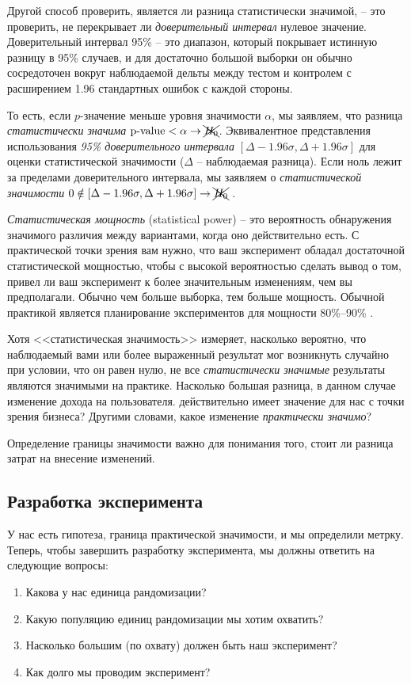 \documentclass[%
	11pt,
	a4paper,
	utf8,
		]{article}
\begin{document}
Другой способ проверить, является ли разница статистически значимой, -- это проверить, не перекрывает ли \emph{доверительный интервал} нулевое значение. Доверительный интервал 95\% -- это диапазон, который покрывает истинную разницу в 95\% случаев, и для достаточно большой выборки он обычно сосредоточен вокруг наблюдаемой дельты между тестом и контролем с расширением 1.96 стандартных ошибок с каждой стороны.

То есть, если $p$-значение меньше уровня значимости $\alpha$, мы заявляем, что разница \emph{статистически значима} {\color{blue}$ \text{p-value} < \alpha \to \xcancel{H_0} $}. Эквивалентное представления использования \emph{95\% доверительного интервала} $[\Delta - 1.96 \sigma, \Delta + 1.96 \sigma]$ для оценки статистической значимости ($\Delta$ -- наблюдаемая разница). Если ноль лежит за пределами доверительного интервала, мы заявляем о \emph{статистической значимости} {\color{blue}$0 \notin [\Delta - 1.96 \sigma, \Delta + 1.96 \sigma] \to \xcancel{H_0}$} \cite[]{kohavi:ab-tests-2021}.

\emph{Статистическая мощность} (statistical power) -- это вероятность обнаружения значимого различия между вариантами, когда оно действительно есть. С практической точки зрения вам нужно, что ваш эксперимент обладал достаточной статистической мощностью, чтобы с высокой вероятностью сделать вывод о том, привел ли ваш эксперимент к более значительным изменениям, чем вы предполагали. Обычно чем больше выборка, тем больше мощность. Обычной практикой является планирование экспериментов для мощности 80\%--90\% \cite[]{kohavi:ab-tests-2021}.

Хотя <<статистическая значимость>> измеряет, насколько вероятно, что наблюдаемый вами или более выраженный результат мог возникнуть случайно при условии, что он равен нулю, не все \emph{статистически значимые} результаты являются значимыми на практике. Насколько большая разница, в данном случае изменение дохода на пользователя. действительно имеет значение для нас с точки зрения бизнеса? Другими словами, какое изменение \emph{практически значимо}?

Определение границы значимости важно для понимания того, стоит ли разница затрат на внесение изменений.

\subsection{Разработка эксперимента}

У нас есть гипотеза, граница практической значимости, и мы определили метрку. Теперь, чтобы завершить разработку эксперимента, мы должны ответить на следующие вопросы:
\begin{enumerate}
	\item Какова у нас единица рандомизации?
	
	\item Какую популяцию единиц рандомизации мы хотим охватить?
	
	\item Насколько большим (по охвату) должен быть наш эксперимент?
	
	\item Как долго мы проводим эксперимент?
\end{enumerate}
\end{document}
